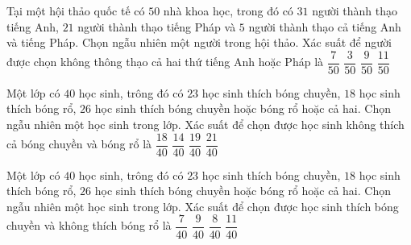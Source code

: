\begin{ex} %
	Tại một hội thảo quốc tế có $50$ nhà khoa học, trong đó có $31$ người thành thạo tiếng Anh, $21$ người thành thạo tiếng Pháp và $5$ người thành thạo cả tiếng Anh và tiếng Pháp. Chọn ngẫu nhiên một người trong hội thảo. Xác suất để người được chọn không thông thạo cả hai thứ tiếng Anh hoặc Pháp là 
	\choice
	{$\dfrac{7}{50}$}
	{\True$\dfrac{3}{50}$}
	{$\dfrac{9}{50}$}
	{$\dfrac{11}{50}$}
\end{ex}
\begin{ex}%
	Một lớp có $40$ học sinh, trông đó có $23$ học sinh thích bóng chuyền, $18$ học sinh thích bóng rổ, $26$ học sinh thích bóng chuyền hoặc bóng rổ hoặc cả hai. Chọn ngẫu nhiên một học sinh trong lớp. Xác suất để chọn được học sinh không thích cả bóng chuyền và bóng rổ là
	\choice
	{$\dfrac{18}{40}$} 
	{\True$\dfrac{14}{40}$} 
	{$\dfrac{19}{40}$} 
	{$\dfrac{21}{40}$}
\end{ex}
\begin{ex}%
	Một lớp có $40$ học sinh, trông đó có $23$ học sinh thích bóng chuyền, $18$ học sinh thích bóng rổ, $26$ học sinh thích bóng chuyền hoặc bóng rổ hoặc cả hai. Chọn ngẫu nhiên một học sinh trong lớp. Xác suất để chọn được học sinh thích bóng chuyền và không thích bóng rổ là 
	\choice
	{$\dfrac{7}{40}$} 
	{$\dfrac{9}{40}$} 
	{\True$\dfrac{8}{40}$} 
	{$\dfrac{11}{40}$}
\end{ex}
